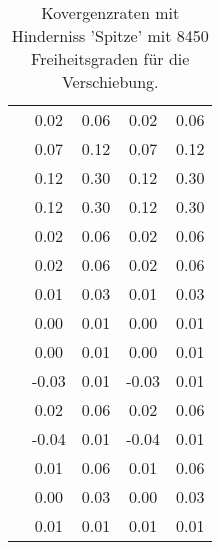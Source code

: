 \begin{table}
\begin{tabular}{c|cc|cc|}
\multicolumn{1}{|c|}{} & \multicolumn{1}{|c|}{      0.02} & \multicolumn{1}{|c|}{      0.06} & \multicolumn{1}{|c|}{      0.02} & \multicolumn{1}{|c|}{      0.06} \\ 
\multicolumn{1}{|c|}{} & \multicolumn{1}{|c|}{      0.07} & \multicolumn{1}{|c|}{      0.12} & \multicolumn{1}{|c|}{      0.07} & \multicolumn{1}{|c|}{      0.12} \\ 
\multicolumn{1}{|c|}{} & \multicolumn{1}{|c|}{      0.12} & \multicolumn{1}{|c|}{      0.30} & \multicolumn{1}{|c|}{      0.12} & \multicolumn{1}{|c|}{      0.30} \\ 
\multicolumn{1}{|c|}{} & \multicolumn{1}{|c|}{      0.12} & \multicolumn{1}{|c|}{      0.30} & \multicolumn{1}{|c|}{      0.12} & \multicolumn{1}{|c|}{      0.30} \\ 
\multicolumn{1}{|c|}{} & \multicolumn{1}{|c|}{      0.02} & \multicolumn{1}{|c|}{      0.06} & \multicolumn{1}{|c|}{      0.02} & \multicolumn{1}{|c|}{      0.06} \\ 
\multicolumn{1}{|c|}{} & \multicolumn{1}{|c|}{      0.02} & \multicolumn{1}{|c|}{      0.06} & \multicolumn{1}{|c|}{      0.02} & \multicolumn{1}{|c|}{      0.06} \\ 
\multicolumn{1}{|c|}{} & \multicolumn{1}{|c|}{      0.01} & \multicolumn{1}{|c|}{      0.03} & \multicolumn{1}{|c|}{      0.01} & \multicolumn{1}{|c|}{      0.03} \\ 
\multicolumn{1}{|c|}{} & \multicolumn{1}{|c|}{      0.00} & \multicolumn{1}{|c|}{      0.01} & \multicolumn{1}{|c|}{      0.00} & \multicolumn{1}{|c|}{      0.01} \\ 
\multicolumn{1}{|c|}{} & \multicolumn{1}{|c|}{      0.00} & \multicolumn{1}{|c|}{      0.01} & \multicolumn{1}{|c|}{      0.00} & \multicolumn{1}{|c|}{      0.01} \\ 
\multicolumn{1}{|c|}{} & \multicolumn{1}{|c|}{     -0.03} & \multicolumn{1}{|c|}{      0.01} & \multicolumn{1}{|c|}{     -0.03} & \multicolumn{1}{|c|}{      0.01} \\ 
\multicolumn{1}{|c|}{} & \multicolumn{1}{|c|}{      0.02} & \multicolumn{1}{|c|}{      0.06} & \multicolumn{1}{|c|}{      0.02} & \multicolumn{1}{|c|}{      0.06} \\ 
\multicolumn{1}{|c|}{} & \multicolumn{1}{|c|}{     -0.04} & \multicolumn{1}{|c|}{      0.01} & \multicolumn{1}{|c|}{     -0.04} & \multicolumn{1}{|c|}{      0.01} \\ 
\multicolumn{1}{|c|}{} & \multicolumn{1}{|c|}{      0.01} & \multicolumn{1}{|c|}{      0.06} & \multicolumn{1}{|c|}{      0.01} & \multicolumn{1}{|c|}{      0.06} \\ 
\multicolumn{1}{|c|}{} & \multicolumn{1}{|c|}{      0.00} & \multicolumn{1}{|c|}{      0.03} & \multicolumn{1}{|c|}{      0.00} & \multicolumn{1}{|c|}{      0.03} \\ 
\multicolumn{1}{|c|}{} & \multicolumn{1}{|c|}{      0.01} & \multicolumn{1}{|c|}{      0.01} & \multicolumn{1}{|c|}{      0.01} & \multicolumn{1}{|c|}{      0.01} \\ 
\hline 
\end{tabular}\caption{Kovergenzraten mit Hinderniss 'Spitze' mit 8450 Freiheitsgraden für die Verschiebung.}\label{tab:Rate_Spitze_level5}
\end{table} 
